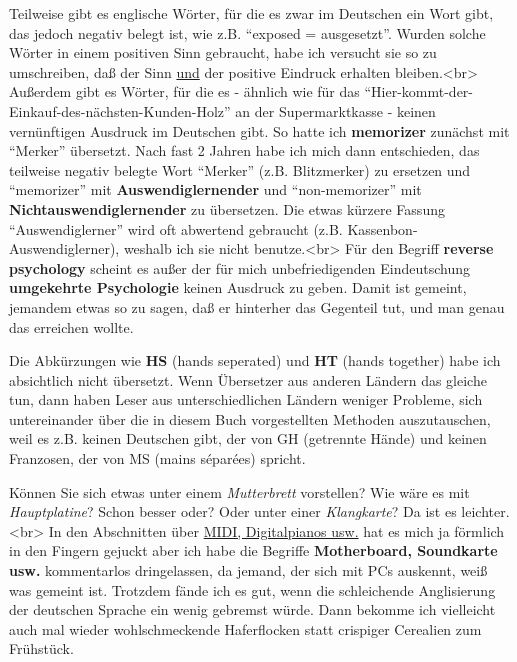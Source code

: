 Teilweise gibt es englische Wörter, für die es zwar im Deutschen ein Wort gibt, das jedoch negativ belegt ist, wie z.B. \enquote{exposed = ausgesetzt}.
Wurden solche Wörter in einem positiven Sinn gebraucht, habe ich versucht sie so zu umschreiben, daß der Sinn \underline{und} der positive Eindruck erhalten bleiben.<br>
\hypertarget{memorizer}{}
Außerdem gibt es Wörter, für die es - ähnlich wie für das \enquote{Hier-kommt-der-Einkauf-des-nächsten-Kunden-Holz} an der Supermarktkasse - keinen vernünftigen Ausdruck im Deutschen gibt.
So hatte ich \textbf{memorizer} zunächst mit \enquote{Merker} übersetzt. Nach fast 2 Jahren habe ich mich dann entschieden, das teilweise negativ belegte Wort \enquote{Merker} (z.B. Blitzmerker) zu ersetzen und \enquote{memorizer} mit \textbf{Auswendiglernender} und \enquote{non-memorizer} mit \textbf{Nichtauswendiglernender} zu übersetzen. Die etwas kürzere Fassung \enquote{Auswendiglerner} wird oft abwertend gebraucht (z.B. Kassenbon-Auswendiglerner), weshalb ich sie nicht benutze.<br>
\hypertarget{reversepsychology}{}
Für den Begriff \textbf{reverse psychology} scheint es außer der für mich unbefriedigenden Eindeutschung \textbf{umgekehrte Psychologie} keinen Ausdruck zu geben.
Damit ist gemeint, jemandem etwas so zu sagen, daß er hinterher das Gegenteil tut, und man genau das erreichen wollte.


\hypertarget{HsHt}{}

Die Abkürzungen wie \textbf{HS} (hands seperated) und \textbf{HT} (hands together) habe ich absichtlich nicht übersetzt.
Wenn Übersetzer aus anderen Ländern das gleiche tun, dann haben Leser aus unterschiedlichen Ländern weniger Probleme, sich untereinander über die in diesem Buch vorgestellten Methoden auszutauschen, weil es z.B. keinen Deutschen gibt, der von GH (getrennte Hände) und keinen Franzosen, der von MS (mains séparées) spricht.


\hypertarget{Motherboard}{}

Können Sie sich etwas unter einem \textit{Mutterbrett} vorstellen? Wie wäre es mit \textit{Hauptplatine}?
Schon besser oder?
Oder unter einer \textit{Klangkarte}? Da ist es leichter.<br>
In den Abschnitten über \hyperlink{c1iii13MIDI}{MIDI, Digitalpianos usw.} hat es mich ja förmlich in den Fingern gejuckt aber ich habe die Begriffe \textbf{Motherboard, Soundkarte usw.} kommentarlos dringelassen, da jemand, der sich mit PCs auskennt, weiß was gemeint ist.
Trotzdem fände ich es gut, wenn die schleichende Anglisierung der deutschen Sprache ein wenig gebremst würde.
Dann bekomme ich vielleicht auch mal wieder wohlschmeckende Haferflocken statt crispiger Cerealien zum Frühstück.



